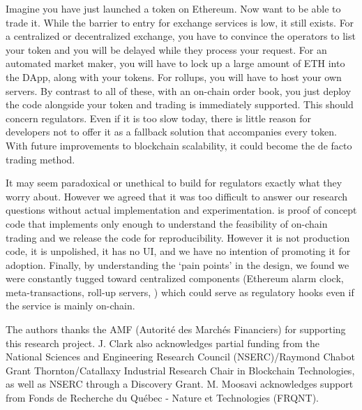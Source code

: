 Imagine you have just launched a token on Ethereum. Now want to be able to trade it. While the barrier to entry for exchange services is low, it still exists. For a centralized or decentralized exchange, you have to convince the operators to list your token and you will be delayed while they process your request. For an automated market maker, you will have to lock up a large amount of ETH into the DApp, along with your tokens. For rollups, you will have to host your own servers. By contrast to all of these, with an on-chain order book, you just deploy the code alongside your token and trading is immediately supported. This should concern regulators. Even if it is too slow today, there is little reason for developers not to offer it as a fallback solution that accompanies every token. With future improvements to blockchain scalability, it could become the de facto trading method. 

It may seem paradoxical or unethical to build for regulators exactly what they worry about. However we agreed that it was too difficult to answer our research questions without actual implementation and experimentation. \cm is proof of concept code that implements only enough to understand the feasibility of on-chain trading and we release the code for reproducibility. However it is not production code, it is unpolished, it has no UI, and we have no intention of promoting it for adoption. Finally, by understanding the `pain points' in the design, we found we were constantly tugged toward centralized components (Ethereum alarm clock, meta-transactions, roll-up servers, \etc) which could serve as regulatory hooks even if the service is mainly on-chain.
 
 
\begin{acks} 
The authors thanks the AMF (Autorité des Marchés Financiers) for supporting this research project. J. Clark also acknowledges partial funding from the National Sciences and Engineering Research Council (NSERC)/Raymond Chabot Grant Thornton/Catallaxy Industrial Research Chair in Blockchain Technologies, as well as NSERC through a Discovery Grant. M. Moosavi acknowledges support from Fonds de Recherche du Québec - Nature et Technologies (FRQNT).
\end{acks}


























